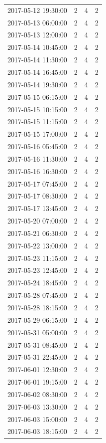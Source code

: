 \begin{tabular}{lrrr}
2017-05-12 19:30:00 & 2 & 4 & 2 \\
2017-05-13 06:00:00 & 2 & 4 & 2 \\
2017-05-13 12:00:00 & 2 & 4 & 2 \\
2017-05-14 10:45:00 & 2 & 4 & 2 \\
2017-05-14 11:30:00 & 2 & 4 & 2 \\
2017-05-14 16:45:00 & 2 & 4 & 2 \\
2017-05-14 19:30:00 & 2 & 4 & 2 \\
2017-05-15 06:15:00 & 2 & 4 & 2 \\
2017-05-15 10:15:00 & 2 & 4 & 2 \\
2017-05-15 11:15:00 & 2 & 4 & 2 \\
2017-05-15 17:00:00 & 2 & 4 & 2 \\
2017-05-16 05:45:00 & 2 & 4 & 2 \\
2017-05-16 11:30:00 & 2 & 4 & 2 \\
2017-05-16 16:30:00 & 2 & 4 & 2 \\
2017-05-17 07:45:00 & 2 & 4 & 2 \\
2017-05-17 08:30:00 & 2 & 4 & 2 \\
2017-05-17 13:45:00 & 2 & 4 & 2 \\
2017-05-20 07:00:00 & 2 & 4 & 2 \\
2017-05-21 06:30:00 & 2 & 4 & 2 \\
2017-05-22 13:00:00 & 2 & 4 & 2 \\
2017-05-23 11:15:00 & 2 & 4 & 2 \\
2017-05-23 12:45:00 & 2 & 4 & 2 \\
2017-05-24 18:45:00 & 2 & 4 & 2 \\
2017-05-28 07:45:00 & 2 & 4 & 2 \\
2017-05-28 18:15:00 & 2 & 4 & 2 \\
2017-05-29 06:15:00 & 2 & 4 & 2 \\
2017-05-31 05:00:00 & 2 & 4 & 2 \\
2017-05-31 08:45:00 & 2 & 4 & 2 \\
2017-05-31 22:45:00 & 2 & 4 & 2 \\
2017-06-01 12:30:00 & 2 & 4 & 2 \\
2017-06-01 19:15:00 & 2 & 4 & 2 \\
2017-06-02 08:30:00 & 2 & 4 & 2 \\
2017-06-03 13:30:00 & 2 & 4 & 2 \\
2017-06-03 15:00:00 & 2 & 4 & 2 \\
2017-06-03 18:15:00 & 2 & 4 & 2 \\

\end{tabular}
